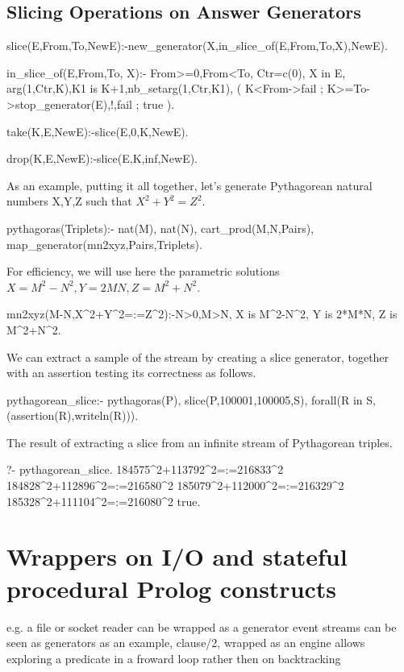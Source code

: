 \documentclass{new_tlp}
\begin{document}
\subsection{Slicing Operations on Answer Generators}
\begin{code}
slice(E,From,To,NewE):-new_generator(X,in_slice_of(E,From,To,X),NewE).

in_slice_of(E,From,To, X):-
  From>=0,From<To,
  Ctr=c(0),
  X in E,
  arg(1,Ctr,K),K1 is K+1,nb_setarg(1,Ctr,K1),
  (
    K<From->fail
  ; K>=To->stop_generator(E),!,fail
  ; true
  ).
  
take(K,E,NewE):-slice(E,0,K,NewE).

drop(K,E,NewE):-slice(E,K,inf,NewE).
\end{code}

As an example, putting it all together, let's generate Pythagorean natural numbers X,Y,Z such
that $X^2+Y^2=Z^2$.

\begin{code}
pythagoras(Triplets):-
  nat(M),
  nat(N),
  cart_prod(M,N,Pairs),
  map_generator(mn2xyz,Pairs,Triplets).
\end{code}
For efficiency, we will use here the parametric solutions
$X=M^2-N^2, Y=2MN, Z=M^2+N^2$.
\begin{code}
mn2xyz(M-N,X^2+Y^2=:=Z^2):-N>0,M>N,
  X is M^2-N^2,
  Y is 2*M*N,
  Z is M^2+N^2.
\end{code}
We can extract a sample of the stream by creating
a slice generator, together with an assertion testing its correctness as follows.
\begin{code}
pythagorean_slice:-
  pythagoras(P),
  slice(P,100001,100005,S),
  forall(R in S,(assertion(R),writeln(R))).
\end{code}

\BX
The result of extracting a slice from an infinite stream of Pythagorean triples.
\begin{codex}
?- pythagorean_slice.
184575^2+113792^2=:=216833^2
184828^2+112896^2=:=216580^2
185079^2+112000^2=:=216329^2
185328^2+111104^2=:=216080^2
true.
\end{codex}
\EX

\section{Wrappers on I/O and stateful procedural Prolog constructs}

\BI
\I e.g. a file or socket reader can be wrapped as a generator
\I event streams can be seen as generators 
\I as an example, clause/2, wrapped as an engine allows exploring a predicate in a froward loop rather then on backtracking
\EI
\end{document}
